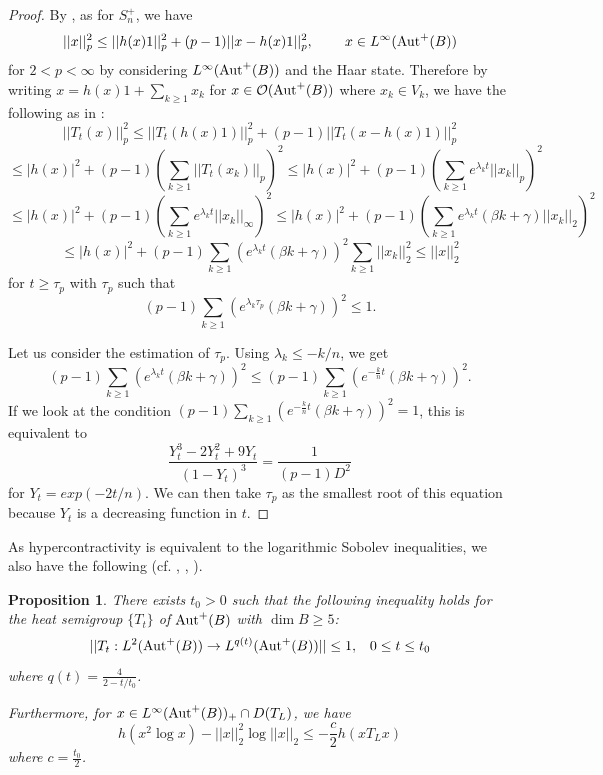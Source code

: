 \documentclass[12pt]{amsart}
\theoremstyle{plain} %
\newtheorem{proposition}[equation]{Proposition}
\theoremstyle{definition}
\theoremstyle{remark}
\begin{document}
\begin{proof}
By \cite[Theorem 1]{RX}, as for $S_n^+$, we have
\[||x||_p^2\leq||h(x)1||_p^2+(p-1)||x-h(x)1||_p^2,\;\;\;\;\;\;\;\;x\in L^{\infty}({\rm Aut}^+(B))\]
for $2<p<\infty$ by considering $L^{\infty}({\rm Aut}^+(B))$ and the Haar state. Therefore by writing $x=h(x)1+\sum_{k\geq1} x_k$ for $x\in \mathcal{O}({\rm Aut}^+(B))$ where $x_k\in V_k$, we have the following as in \cite[Theorem 2.4]{FHLUZ}:
\[||T_t(x)||_p^2\leq||T_t(h(x)1)||_p^2+(p-1)||T_t(x-h(x)1)||_p^2\]
\[\leq|h(x)|^2+(p-1)\left(\sum_{k\geq1}||T_t(x_k)||_p\right)^2
\leq|h(x)|^2+(p-1)\left(\sum_{k\geq1}e^{\lambda_k t}||x_k||_p\right)^2\]
\[\leq|h(x)|^2+(p-1)\left(\sum_{k\geq1}e^{\lambda_k t}||x_k||_{\infty}\right)^2
\leq|h(x)|^2+(p-1)\left(\sum_{k\geq1}e^{\lambda_k t}(\beta k+\gamma)||x_k||_2\right)^2\]
\[\leq |h(x)|^2+(p-1) \sum_{k\geq1}(e^{\lambda_k t}(\beta k+\gamma))^2\sum _{k\geq1} ||x_k||_2^2 \leq||x||_2^2\]
for $t\geq \tau_p$ with $\tau_p$ such that
\[(p-1) \sum_{k\geq1}(e^{\lambda_k \tau_p}(\beta k+\gamma))^2\leq 1.\]

 
 Let us consider the estimation of $\tau_p$. Using $\lambda_k \le -k/n$, we get 
 \[(p-1) \sum_{k\geq1}(e^{\lambda_k t}(\beta k+\gamma))^2 \le (p-1) \sum_{k\geq1}(e^{-\frac{k}{n} t}(\beta k+\gamma))^2.\]
 If we look at the condition $(p-1) \sum_{k\geq1}(e^{-\frac{k}{n} t}(\beta k+\gamma))^2= 1$, this is equivalent to 
 \[\frac{Y_t^3-2Y_t^2+9Y_t}{(1-Y_t)^3}=\frac{1}{(p-1)D^2}\]
  for $Y_t = exp(-2t/n)$. We can then take $\tau_p$ as the smallest root of this equation because $Y_t$ is a decreasing function in $t
 $.

\end{proof}

As hypercontractivity is equivalent to the logarithmic Sobolev inequalities, we also have the following (cf. \cite[Proposition 3.4, Theorem 3.5]{FHLUZ}, \cite{Gro75}, \cite[Section 3]{OZ}).

\begin{proposition}
There exists $t_0>0$ such that the following inequality holds for the heat semigroup $\{T_t\}$ of ${\rm Aut}^+(B)$ with $\dim B\geq5$:
\[||T_t:L^2({\rm Aut}^+(B))\to L^{q(t)}({\rm Aut}^+(B))||\leq 1,\;\;\;0\leq t \leq t_0\]
where $q(t)=\frac{4}{2-t/t_0}$.

Furthermore, for $x\in L^{\infty}({\rm Aut}^+(B))_+\cap D(T_L)$, we have
\[h(x^2\log{x})-||x||_2^2\log{||x||_2}\leq-\frac{c}{2}h(xT_Lx)\]
where $c=\frac{t_0}{2}$.
\end{proposition}
\end{document}
